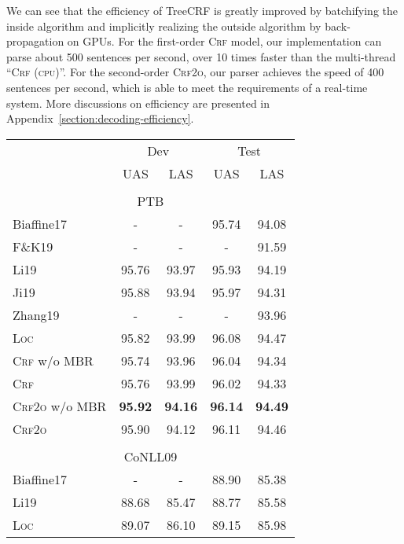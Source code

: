 \documentclass[11pt,a4paper]{article}
\begin{document}
We can see that the efficiency of TreeCRF is greatly improved by batchifying the inside algorithm and implicitly
realizing the outside algorithm by back-propagation on GPUs.
For the first-order \textsc{Crf} model,
our implementation can parse about 500 sentences per second, over 10 times faster than the multi-thread ``\textsc{Crf (cpu)}''.
For the second-order \textsc{Crf2o}, our parser achieves the speed of 400 sentences per second, which is able to meet the requirements of a real-time system.
More discussions on efficiency are presented in Appendix~\ref{section:decoding-efficiency}.






 


\begin{table}[tb]
\setlength{\tabcolsep}{4.2pt}
\centering
\begin{tabular}{lcccc}
\toprule
& \multicolumn{2}{c}{Dev} & \multicolumn{2}{c}{Test} \\
& UAS & LAS & UAS & LAS \\[2pt]
\hline
\\[-8pt]
\multicolumn{5}{c}{PTB} \\
Biaffine17 & - & - & 95.74 & 94.08 \\
F\&K19 & - &  -  & -     & 91.59 \\
Li19 & 95.76 &  93.97 & 95.93 & 94.19 \\
Ji19 & 95.88 & 93.94 & 95.97 & 94.31 \\
Zhang19 & - & - & -  & 93.96 \\[3pt]
\textsc{Loc}             & 95.82          & 93.99          & 96.08          & 94.47 \\
\textsc{Crf} w/o MBR     & 95.74          & 93.96          & 96.04          & 94.34 \\
\textsc{Crf}             & 95.76          & 93.99          & 96.02          & 94.33 \\
\textsc{Crf2o} w/o MBR   & \textbf{95.92} & \textbf{94.16} & \textbf{96.14} & \textbf{94.49} \\
\textsc{Crf2o}           & 95.90          & 94.12          & 96.11          & 94.46 \\[2pt]
\hline
\\[-8pt]
\multicolumn{5}{c}{CoNLL09} \\
Biaffine17 & - & - & 88.90 & 85.38 \\
Li19 & 88.68 & 85.47 & 88.77 & 85.58 \\[3pt]
\textsc{Loc} & 89.07 & 86.10 & 89.15 & 85.98 \\

\end{tabular}
\end{table}
\end{document}
